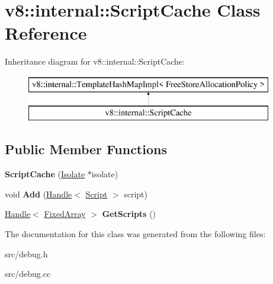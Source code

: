 \hypertarget{classv8_1_1internal_1_1_script_cache}{}\section{v8\+:\+:internal\+:\+:Script\+Cache Class Reference}
\label{classv8_1_1internal_1_1_script_cache}
Inheritance diagram for v8\+:\+:internal\+:\+:Script\+Cache\+:\begin{figure}[H]
\begin{center}
\leavevmode
\includegraphics[height=2.000000cm]{classv8_1_1internal_1_1_script_cache}
\end{center}
\end{figure}
\subsection*{Public Member Functions}
\begin{DoxyCompactItemize}
\item 
\hypertarget{classv8_1_1internal_1_1_script_cache_a6e02c2b404fe7fd9558ce6f48ffcbfb9}{}{\bfseries Script\+Cache} (\hyperlink{classv8_1_1internal_1_1_isolate}{Isolate} $\ast$isolate)\label{classv8_1_1internal_1_1_script_cache_a6e02c2b404fe7fd9558ce6f48ffcbfb9}

\item 
\hypertarget{classv8_1_1internal_1_1_script_cache_ae5682f6ee02bfa376067253a4707253c}{}void {\bfseries Add} (\hyperlink{classv8_1_1internal_1_1_handle}{Handle}$<$ \hyperlink{classv8_1_1internal_1_1_script}{Script} $>$ script)\label{classv8_1_1internal_1_1_script_cache_ae5682f6ee02bfa376067253a4707253c}

\item 
\hypertarget{classv8_1_1internal_1_1_script_cache_a6b6bdf9979580efe9c46e8fa12db6449}{}\hyperlink{classv8_1_1internal_1_1_handle}{Handle}$<$ \hyperlink{classv8_1_1internal_1_1_fixed_array}{Fixed\+Array} $>$ {\bfseries Get\+Scripts} ()\label{classv8_1_1internal_1_1_script_cache_a6b6bdf9979580efe9c46e8fa12db6449}

\end{DoxyCompactItemize}


The documentation for this class was generated from the following files\+:\begin{DoxyCompactItemize}
\item 
src/debug.\+h\item 
src/debug.\+cc\end{DoxyCompactItemize}
